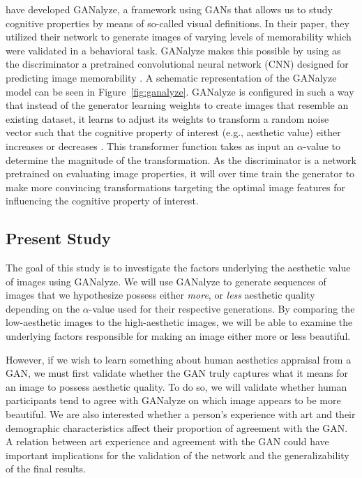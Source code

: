 \documentclass[../main.tex]{subfiles}
\begin{document}
\textcite{goetschalckxGANalyzeVisualDefinitions2019} have developed GANalyze, a framework using GANs that allows us to study cognitive properties by means of so-called visual definitions. In their paper, they utilized their network to generate images of varying levels of memorability which were validated in a behavioral task. GANalyze makes this possible by using as the discriminator a pretrained convolutional neural network (CNN) designed for predicting image memorability \parencite{khosla2015understanding}. A schematic representation of the GANalyze model can be seen in Figure~\ref{fig:ganalyze}. GANalyze is configured in such a way that instead of the generator learning weights to create images that resemble an existing dataset, it learns to adjust its weights to transform a random noise vector such that the cognitive property of interest (e.g., aesthetic value) either increases or decreases \parencite{goetschalckxGANalyzeVisualDefinitions2019}. This transformer function takes as input an $\alpha$-value to determine the magnitude of the transformation. As the discriminator is a network pretrained on evaluating image properties, it will over time train the generator to make more convincing transformations targeting the optimal image features for influencing the cognitive property of interest.



\subsection{Present Study}
The goal of this study is to investigate the factors underlying the aesthetic value of images using GANalyze. We will use GANalyze to generate sequences of images that we hypothesize possess either \textit{more}, or \textit{less} aesthetic quality depending on the $\alpha$-value used for their respective generations. By comparing the low-aesthetic images to the high-aesthetic images, we will be able to examine the underlying factors responsible for making an image either more or less beautiful.


However, if we wish to learn something about human aesthetics appraisal from a GAN, we must first validate whether the GAN truly captures what it means for an image to possess aesthetic quality. To do so, we will validate whether human participants tend to agree with GANalyze on which image appears to be more beautiful. We are also interested whether a person's experience with art and their demographic characteristics affect their proportion of agreement with the GAN. A relation between art experience and agreement with the GAN could have important implications for the validation of the network and the generalizability of the final results.
\end{document}
